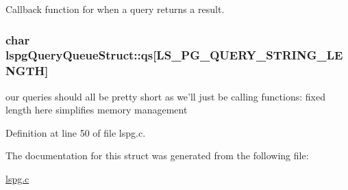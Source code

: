 Callback function for when a query returns a result. \hypertarget{structlspgQueryQueueStruct_abf8c9c581b38a5e3e269eda69e47de15}{
\subsubsection[{qs}]{\setlength{\rightskip}{0pt plus 5cm}char {\bf lspgQueryQueueStruct::qs}\mbox{[}LS\_\-PG\_\-QUERY\_\-STRING\_\-LENGTH\mbox{]}}}
\label{structlspgQueryQueueStruct_abf8c9c581b38a5e3e269eda69e47de15}


our queries should all be pretty short as we'll just be calling functions: fixed length here simplifies memory management 

Definition at line 50 of file lspg.c.

The documentation for this struct was generated from the following file:\begin{DoxyCompactItemize}
\item 
\hyperlink{lspg_8c}{lspg.c}\end{DoxyCompactItemize}
